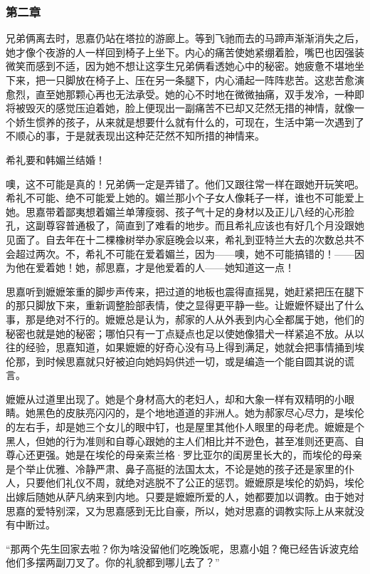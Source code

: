 \subsubsection{第二章}

\par 兄弟俩离去时，思嘉仍站在塔拉的游廊上。等到飞驰而去的马蹄声渐渐消失之后，她才像个夜游的人一样回到椅子上坐下。内心的痛苦使她紧绷着脸，嘴巴也因强装微笑而感到不适，因为她不想让这孪生兄弟俩看透她心中的秘密。她疲惫不堪地坐下来，把一只脚放在椅子上、压在另一条腿下，内心涌起一阵阵悲苦。这悲苦愈演愈烈，直至她那颗心再也无法承受。她的心不时地在微微抽痛，双手发冷，一种即将被毁灭的感觉压迫着她，脸上便现出一副痛苦不已却又茫然无措的神情，就像一个娇生惯养的孩子，从来就是想要什么就有什么的，可现在，生活中第一次遇到了不顺心的事，于是就表现出这种茫茫然不知所措的神情来。
\par 希礼要和韩媚兰结婚！
\par 噢，这不可能是真的！兄弟俩一定是弄错了。他们又跟往常一样在跟她开玩笑吧。希礼不可能、绝不可能爱上她的。媚兰那小个子女人像耗子一样，谁也不可能爱上她。思嘉带着鄙夷想着媚兰单薄瘦弱、孩子气十足的身材以及正儿八经的心形脸孔，这副尊容普通极了，简直到了难看的地步。而且希礼应该也有好几个月没跟她见面了。自去年在十二棵橡树举办家庭晚会以来，希礼到亚特兰大去的次数总共不会超过两次。不，希礼不可能在爱着媚兰，因为——噢，她不可能搞错的！——因为他在爱着她！她，郝思嘉，才是他爱着的人——她知道这一点！
\par 思嘉听到嬷嬷笨重的脚步声传来，把过道的地板也震得直摇晃，她赶紧把压在腿下的那只脚放下来，重新调整脸部表情，使之显得更平静一些。让嬷嬷怀疑出了什么事，那是绝对不行的。嬷嬷总是认为，郝家的人从外表到内心全都属于她，他们的秘密也就是她的秘密；哪怕只有一丁点疑点也足以使她像猎犬一样紧追不放。从以往的经验，思嘉知道，如果嬷嬷的好奇心没有马上得到满足，她就会把事情捅到埃伦那，到时候思嘉就只好被迫向她妈妈供述一切，或是编造一个能自圆其说的谎言。
\par 嬷嬷从过道里出现了。她是个身材高大的老妇人，却和大象一样有双精明的小眼睛。她黑色的皮肤亮闪闪的，是个地地道道的非洲人。她为郝家尽心尽力，是埃伦的左右手，却是她三个女儿的眼中钉，也是屋里其他仆人眼里的母老虎。嬷嬷是个黑人，但她的行为准则和自尊心跟她的主人们相比并不逊色，甚至准则还更高、自尊心还更强。她是在埃伦的母亲索兰格·罗比亚尔的闺房里长大的，而埃伦的母亲是个举止优雅、冷静严肃、鼻子高挺的法国太太，不论是她的孩子还是家里的仆人，只要他们礼仪不周，就绝对逃脱不了公正的惩罚。嬷嬷原是埃伦的奶妈，埃伦出嫁后随她从萨凡纳来到内地。只要是嬷嬷所爱的人，她都要加以调教。由于她对思嘉的爱特别深，又为思嘉感到无比自豪，所以，她对思嘉的调教实际上从来就没有中断过。
\par “那两个先生回家去啦？你为啥没留他们吃晚饭呢，思嘉小姐？俺已经告诉波克给他们多摆两副刀叉了。你的礼貌都到哪儿去了？”
